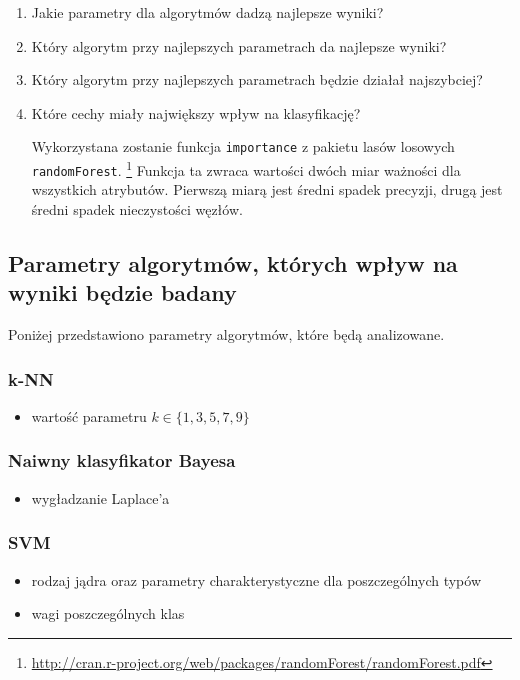 \documentclass[a4paper, 12pt]{article}
\begin{document}
\begin{enumerate}
 \item Jakie parametry dla algorytmów dadzą najlepsze wyniki?
 \item Który algorytm przy najlepszych parametrach da najlepsze wyniki?
 \item Który algorytm przy najlepszych parametrach będzie działał najszybciej?
 \item Które cechy miały największy wpływ na klasyfikację?

Wykorzystana zostanie funkcja \texttt{importance} z pakietu lasów losowych \texttt{randomForest}.
\footnote{\url{http://cran.r-project.org/web/packages/randomForest/randomForest.pdf}}
Funkcja ta zwraca wartości dwóch miar ważności dla wszystkich atrybutów.
Pierwszą miarą jest średni spadek precyzji, drugą jest średni spadek nieczystości węzłów.
\end{enumerate}

\subsection{Parametry algorytmów, których wpływ na wyniki będzie badany}
Poniżej przedstawiono parametry algorytmów, które będą analizowane.

\subsubsection*{k-NN}
\begin{itemize}
	\item wartość parametru $k \in \{1, 3, 5, 7, 9\}$
\end{itemize}

\subsubsection*{Naiwny klasyfikator Bayesa}
\begin{itemize}
	\item wygładzanie Laplace'a
\end{itemize}

\subsubsection*{SVM}
\begin{itemize}
 \item rodzaj jądra oraz parametry charakterystyczne dla poszczególnych typów
 \item wagi poszczególnych klas
\end{itemize}
\end{document}
